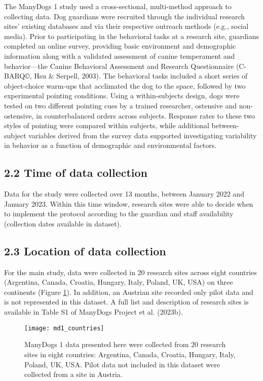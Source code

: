 \documentclass[
  pub,floatsintext]{apa6}
\begin{document}
The ManyDogs 1 study used a cross-sectional, multi-method approach to collecting data. Dog guardians were recruited through the individual research sites' existing databases and via their respective outreach methods (e.g., social media). Prior to participating in the behavioral tasks at a research site, guardians completed an online survey, providing basic environment and demographic information along with a validated assessment of canine temperament and behavior---the Canine Behavioral Assessment and Research Questionnaire (C-BARQ©, Hsu \& Serpell, 2003). The behavioral tasks included a short series of object-choice warm-ups that acclimated the dog to the space, followed by two experimental pointing conditions. Using a within-subjects design, dogs were tested on two different pointing cues by a trained researcher, ostensive and non-ostensive, in counterbalanced orders across subjects. Response rates to these two styles of pointing were compared within subjects, while additional between-subject variables derived from the survey data supported investigating variability in behavior as a function of demographic and environmental factors.

\hypertarget{time-of-data-collection}{%
\subsection{2.2 Time of data collection}\label{time-of-data-collection}}

Data for the study were collected over 13 months, between January 2022 and January 2023. Within this time window, research sites were able to decide when to implement the protocol according to the guardian and staff availability (collection dates available in dataset).

\hypertarget{location-of-data-collection}{%
\subsection{2.3 Location of data collection}\label{location-of-data-collection}}

For the main study, data were collected in 20 research sites across eight countries (Argentina, Canada, Croatia, Hungary, Italy, Poland, UK, USA) on three continents (Figure \ref{fig:countries}). In addition, an Austrian site recorded only pilot data and is not represented in this dataset. A full list and description of research sites is available in Table S1 of ManyDogs Project et al. (2023b).

\begin{figure}

{\centering \texttt{[image: md1\_countries]} 

}

\caption{ManyDogs 1 data presented here were collected from 20 research sites in eight countries: Argentina, Canada, Croatia, Hungary, Italy, Poland, UK, USA. Pilot data not included in this dataset were collected from a site in Austria.}\label{fig:countries}
\end{figure}
\end{document}

